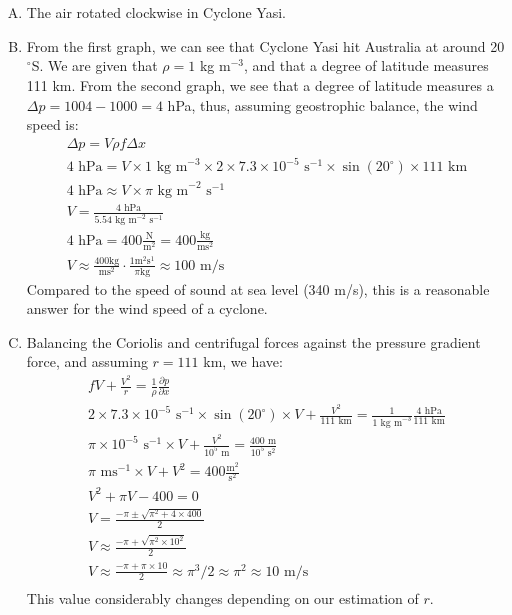 \documentclass[11pt,a4paper,margin=1in]{article}
\begin{document}
\section{}
\begin{enumerate}[A.]
    \item 
    The air rotated clockwise in Cyclone Yasi.
    \item 
    From the first graph, we can see that Cyclone Yasi hit Australia at around 
    20$^{\circ}$S. We are given that $\rho = 1$ kg m$^{-3}$, and that a degree of
    latitude measures 111 km. From the second graph, we see that a degree of
    latitude measures a $\Delta p = 1004 - 1000 = 4$ hPa, thus, assuming 
    geostrophic balance, the wind speed is:
    \begin{gather*}
        \Delta p = V \rho f \Delta x \\
        4 \text{ hPa} = V \times 1 \text{ kg m}^{-3} \times 2 \times 7.3 \times
            10^{-5} \text{ s}^{-1} \times \sin(20^{\circ}) \times 111 \text{ km} \\
        4 \text{ hPa} \approx V \times \pi \text{ kg m}^{-2} \text{ s}^{-1} \\
        V = \frac{4 \text{ hPa}}{5.54 \text{ kg m}^{-2} \text{ s}^{-1}} \\
        4 \text{ hPa} = 400 \frac{\text{N}}{\text{m}^2} = 400 \frac{\text{kg}}
            {\text{ms}^2} \\
        V \approx  \frac{400 \text{kg}}{\text{ms}^2} \cdot \frac{1 \text{m}^2\text{s}^1}
            {\pi \text{kg}} \approx  100 \text{ m/s}
    \end{gather*}
    Compared to the speed of sound at sea level (340 m/s), this is a reasonable 
    answer for the wind speed of a cyclone.
    \item 
    Balancing the Coriolis and centrifugal forces against the pressure gradient
    force, and assuming $r = 111$ km, we have:
    \begin{gather*}
        fV + \frac{V^2}{r} = \frac{1}{\rho} \frac{\partial p}{\partial x}\\
        2 \times 7.3 \times 10^{-5} \text{ s}^{-1} \times \sin(20^{\circ}) \times
            V + \frac{V^2}{111 \text{ km}} = \frac{1}{1 \text{ kg m}^{-3}} 
            \frac{4 \text{ hPa}}{111 \text{ km}} \\
        \pi \times 10^{-5} \text{ s}^{-1} \times V + \frac{V^2}{10^5 \text{ m}} = 
            \frac{400 \text{ m}}{10^5 \text{ s}^2} \\
        \pi \text{ ms}^{-1} \times V + V^2 = 400 \frac{\text{m}^2}{\text{s}^2} \\
        V^2 + \pi V - 400 = 0\\
        V = \frac{-\pi \pm \sqrt{\pi^2 + 4 \times 400}}{2} \\
        V \approx \frac{-\pi + \sqrt{\pi^2 \times 10^2}}{2} \\
        V \approx \frac{-\pi + \pi \times 10}{2} \approx \pi^3 / 2 \approx \pi^2
            \approx 10 \text{ m/s}\\
    \end{gather*}
    This value considerably changes depending on our estimation of $r$.
\end{enumerate}
\end{document}

